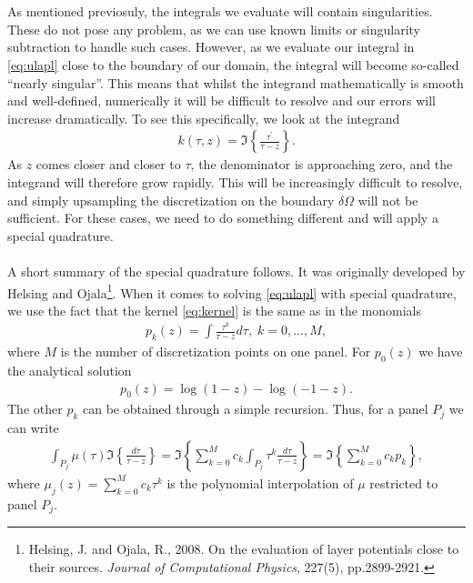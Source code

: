\documentclass[a4paper,10pt]{article}
\begin{document}
\\ \\
As mentioned previosuly, the integrals we evaluate will contain singularities. These do not pose any problem, as we can use known limits or singularity subtraction to handle such cases. However, as we evaluate our integral in \eqref{eq:ulapl} close to the boundary of our domain, the integral will become so-called ``nearly singular''. This means that whilst the integrand mathematically is smooth and well-defined, numerically it will be difficult to resolve and our errors will increase dramatically. To see this specifically, we look at the integrand
\begin{align}
k(\tau,z) = \Im\left\{ \frac{\tau^\prime}{\tau-z}\right\}.
\label{eq:kernel}
\end{align}
As $z$ comes closer and closer to $\tau$, the denominator is approaching zero, and the integrand will therefore grow rapidly. This will be increasingly difficult to resolve, and simply upsampling the discretization on the boundary $\delta\Omega$ will not be sufficient. For these cases, we need to do something different and will apply a special quadrature.
\\ \\
A short summary of the special quadrature follows. It was originally developed by Helsing and Ojala\footnote{Helsing, J. and Ojala, R., 2008. On the evaluation of layer potentials close to their sources. {\em Journal of Computational Physics}, 227(5), pp.2899-2921.}. When it comes to solving \eqref{eq:ulapl} with special quadrature, we use the fact that the kernel \eqref{eq:kernel} is the same as in the monomials 
\begin{align}
    p_k(z) = \int \frac{\tau^k}{\tau-z}d\tau, \; k=0,\hdots,M,
    \label{eq:pkrec}
\end{align}
where $M$ is the number of discretization points on one panel. For $p_0(z)$ we have the analytical solution 
\begin{align}
    p_0(z) = \log(1-z)-\log(-1-z).
    \label{eq:p0}  
\end{align}
The other $p_k$ can be obtained through a simple recursion. Thus, for a panel $P_j$ we can write
\begin{align}
    \int_{P_j} \mu(\tau) \Im\left\{ \frac{d\tau}{\tau-z} \right\} = \Im\left\{ \sum_{k=0}^{M} c_k \int_{P_j} \tau^k\frac{d\tau}{\tau-z} \right\} = \Im\left\{ \sum_{k=0}^{M} c_kp_k \right\},
    \label{eq:specQ}
\end{align}
where $\mu_j(z) = \sum_{k=0}^{M} c_k\tau^k$ is the polynomial interpolation of $\mu$ restricted to panel $P_j$. 
\end{document}
